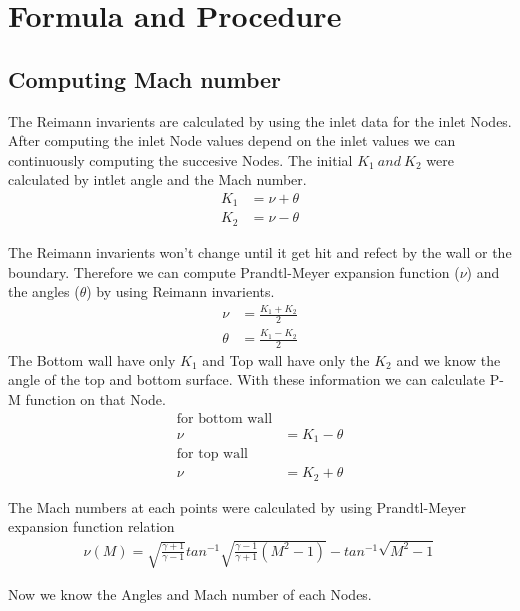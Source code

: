 \documentclass[conf]{new-aiaa}
\begin{document}
\section{Formula and Procedure}
\subsection{Computing Mach number}
\par The Reimann invarients are calculated by using the inlet data for the inlet Nodes. After computing the inlet Node values depend on the inlet values we can continuously computing the succesive Nodes. The initial \(K_1 \ and \ K_2\) were calculated by intlet angle and the Mach number. \\
\begin{align*}
	K_1 &= \nu + \theta \\
	K_2 &= \nu - \theta
\end{align*}
\par The Reimann invarients won't change until it get hit and refect by the wall or the boundary. Therefore we can compute Prandtl-Meyer expansion function ($\nu$) and the angles ($\theta$) by using Reimann invarients.\\
\begin{align*}
	\nu &= \frac{K_1 + K_2}{2} \\
	\theta &= \frac{K_1 - K_2}{2}
\end{align*}
The Bottom wall have only \(K_1\) and Top wall have only the \(K_2\) and we know the angle of the top and bottom surface. With these information we can calculate P-M function on that Node.
\begin{align*}
	\text{for bottom wall} \\
	\nu &= K_1 - \theta \\
	\text{for top wall}\\
	\nu &= K_2 + \theta
\end{align*}

\par The Mach numbers at each points were calculated by using
Prandtl-Meyer expansion function relation
\begin{align*}
	\nu(M) = \sqrt{\frac{\gamma+1}{\gamma-1}}tan^{-1}\sqrt{\frac{\gamma-1}{\gamma+1}\left(M^2-1\right)} - tan^{-1}\sqrt{M^2-1}
\end{align*}
\par Now we know the Angles and Mach number of each Nodes.\\
\end{document}
